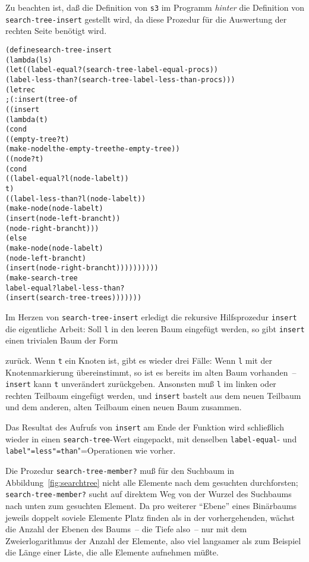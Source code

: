 %
Zu beachten ist, daß die Definition von \texttt{s3} im Programm
\emph{hinter} die Definition von \texttt{search-tree-insert} gestellt
wird, da diese Prozedur für die Auswertung der rechten Seite benötigt wird.
%
\begin{alltt}
(define search-tree-insert
  (lambda (l s)
    (let ((label-equal? (search-tree-label-equal-proc s))
          (label-less-than? (search-tree-label-less-than-proc s)))
      (letrec
          ; (: insert (tree-of %a) -> (tree-of %a))
          ((insert
            (lambda (t)
              (cond
               ((empty-tree? t)
                (make-node l the-empty-tree the-empty-tree))
               ((node? t)
                (cond
                  ((label-equal? l (node-label t))
                   t)
                  ((label-less-than? l (node-label t))
                   (make-node (node-label t)
                              (insert (node-left-branch t))
                              (node-right-branch t)))
                  (else
                   (make-node (node-label t)
                              (node-left-branch t)
                              (insert (node-right-branch t))))))))))
        (make-search-tree
         label-equal? label-less-than?
         (insert (search-tree-tree s)))))))
\end{alltt}
%
Im Herzen von \texttt{search-tree-insert} erledigt die rekursive
Hilfsprozedur \texttt{insert} die eigentliche Arbeit: Soll
\texttt{l} in den leeren Baum eingefügt werden, so gibt
\texttt{insert} einen trivialen Baum der Form
%
\begin{pspdf}
\begin{center}
    {\Tdot\Tdot}
\end{center}
\end{pspdf}
% 
zurück.  Wenn \texttt{t} ein Knoten ist, gibt es wieder drei Fälle:
Wenn \texttt{l} mit der
Knotenmarkierung übereinstimmt, so ist es bereits im alten Baum
vorhanden~-- \texttt{insert} kann \texttt{t} unverändert
zurückgeben.  Ansonsten muß
\texttt{l} im linken oder rechten Teilbaum eingefügt werden,
und \texttt{insert} bastelt aus dem neuen Teilbaum und dem anderen, alten Teilbaum
einen neuen Baum zusammen.

Das Resultat des Aufrufs von \texttt{insert} am Ende der Funktion wird
schließlich wieder in einen \texttt{search-tree}-Wert eingepackt,
mit denselben \texttt{label-equal}- und \texttt{label"=less"=than}"=Operationen wie vorher.

Die Prozedur \texttt{search-tree-member?} muß für den Suchbaum in
Abbildung~\ref{fig:searchtree} nicht alle Elemente nach dem gesuchten
durchforsten; \texttt{search-tree-member?} sucht auf direktem Weg
von der Wurzel des Suchbaums nach unten zum gesuchten Element.  Da pro
weiterer "`Ebene"' eines Binärbaums jeweils doppelt soviele Elemente
Platz finden als in der vorhergehenden, wächst die Anzahl der Ebenen
des Baums~-- die Tiefe also~-- nur mit dem Zweierlogarithmus der
Anzahl der Elemente, also viel langsamer als zum Beispiel die Länge
einer Liste, die alle Elemente aufnehmen müßte.

